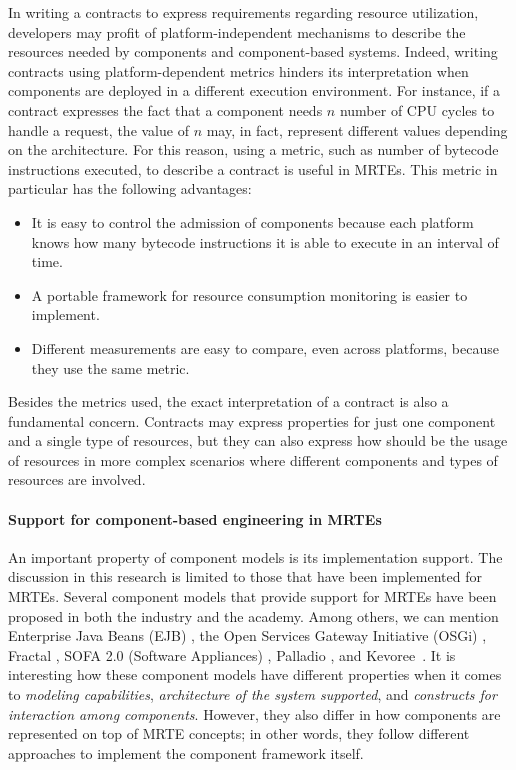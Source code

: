 In writing a contracts to express requirements regarding resource utilization, developers may profit of platform-independent mechanisms to describe the resources needed by components and component-based systems.
Indeed, writing contracts using platform-dependent metrics hinders its interpretation when components are deployed in a different execution environment.
For instance, if a contract expresses the fact that a component needs $n$ number of CPU cycles to handle a request, the value of $n$ may, in fact, represent different values depending on the architecture.
For this reason, using a metric, such as number of bytecode instructions executed, to describe a contract is useful in MRTEs.
This metric in particular has the following advantages:
\begin{itemize}
\item It is easy to control the admission of components because each platform knows how many bytecode instructions it is able to execute in an interval of time.
\item A portable framework for resource consumption monitoring is easier to implement.
\item Different measurements are easy to compare, even across platforms, because they use the same metric.
\end{itemize} 

Besides the metrics used, the exact interpretation of a contract is also a fundamental concern.
Contracts may express properties for just one component and a single type of resources, but they can also express how should be the usage of resources in more complex scenarios where different components and types of resources are involved.


\paragraph{Support for component-based engineering in MRTEs}
An important property of component models is its implementation support.
The discussion in this research is limited to those that have been implemented for MRTEs.
Several component models that provide support for MRTEs have been proposed in both the industry and the academy.
Among others, we can mention Enterprise Java Beans (EJB) \cite{OracleEJB3.0}, the Open Services Gateway Initiative (OSGi) \cite{OSGI:r5}, 
Fractal \cite{Bruneton:2006:FCM:1152333.1152345}, 
SOFA 2.0 (Software Appliances) \cite{Bures2006}, Palladio \cite{Becker:2010:PCM:1712605.1712651}, and Kevoree~\cite{morin09a,leger2010reliable}.
It is interesting how these component models have different properties when it comes to \textit{modeling capabilities}, \textit{architecture of the system supported}, and \textit{constructs for interaction among components}.
However, they also differ in how components are represented on top of MRTE concepts; in other words, they follow different approaches to implement the component framework itself.

